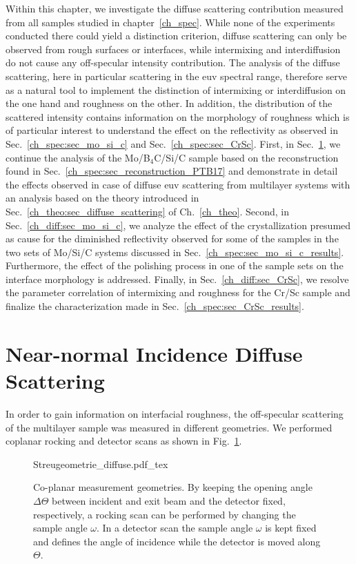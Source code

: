 Within this chapter, we investigate the diffuse scattering contribution measured from all samples studied in chapter~\ref{ch_spec}. While none of the experiments conducted there could yield a distinction criterion, diffuse scattering can only be observed from rough surfaces or interfaces, while intermixing and interdiffusion do not cause any off-specular intensity contribution. The analysis of the diffuse scattering, here in particular scattering in the \gls{euv} spectral range, therefore serve as a natural tool to implement the distinction of intermixing or interdiffusion on the one hand and roughness on the other. In addition, the distribution of the scattered intensity contains information on the morphology of roughness which is of particular interest to understand the effect on the reflectivity as observed in Sec.~\ref{ch_spec:sec_mo_si_c} and Sec.~\ref{ch_spec:sec_CrSc}. First, in Sec.~\ref{ch_diff:sec_PTB17}, we continue the analysis of the Mo/B$_4$C/Si/C sample based on the reconstruction found in Sec.~\ref{ch_spec:sec_reconstruction_PTB17} and demonstrate in detail the effects observed in case of diffuse \gls{euv} scattering from multilayer systems with an analysis based on the theory introduced in Sec.~\ref{ch_theo:sec_diffuse_scattering} of Ch.~\ref{ch_theo}. Second, in Sec.~\ref{ch_diff:sec_mo_si_c}, we analyze the effect of the crystallization presumed as cause for the diminished reflectivity observed for some of the samples in the two sets of Mo/Si/C systems discussed in Sec.~\ref{ch_spec:sec_mo_si_c_results}. Furthermore, the effect of the polishing process in one of the sample sets on the interface morphology is addressed. Finally, in Sec.~\ref{ch_diff:sec_CrSc}, we resolve the parameter correlation of intermixing and roughness for the Cr/Sc sample and finalize the characterization made in Sec.~\ref{ch_spec:sec_CrSc_results}.



\section{Near-normal Incidence Diffuse Scattering} \label{ch_diff:sec_PTB17}


In order to gain information on interfacial roughness, the off-specular scattering of the multilayer sample was measured in different geometries. We performed coplanar rocking and detector scans as shown in Fig.~\ref{fig:measurementGeometry}.

\begin{figure}[htb]
    \def\svgwidth{0.6\textwidth}
    {Streugeometrie_diffuse.pdf_tex}
    \caption{Co-planar measurement geometries. By keeping the opening angle $\Delta\Theta$ between incident and exit beam and the detector fixed, respectively, a rocking scan can be performed by changing the sample angle $\omega$. In a detector scan the sample angle $\omega$ is kept fixed and defines the angle of incidence while the detector is moved along $\Theta$.}
    \label{fig:measurementGeometry}
\end{figure}

